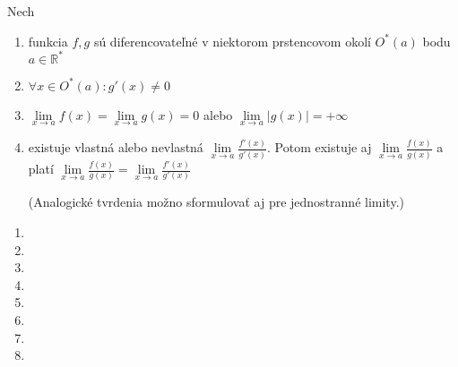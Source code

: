 \begin{veta}
Nech
\begin{enumerate}
\item
  funkcia $f,g$ sú diferencovateľné v niektorom prstencovom okolí $O^*(a)$ bodu
  $a\in\mathbb{R^*}$
\item
  $\forall x\in O^*(a):g'(x)\neq 0$
\item
  $\lim\limits_{x\rightarrow a}f(x)=\lim\limits_{x\rightarrow a}g(x)=0$ alebo
  $\lim\limits_{x\rightarrow a}|g(x)|=+\infty$
\item
  existuje vlastná alebo nevlastná $\lim\limits_{x\rightarrow a}\frac{f'(x)}{g'(x)}$.
  Potom existuje aj $\lim\limits_{x\rightarrow a}\frac{f(x)}{g(x)}$ a platí
  $\lim\limits_{x\rightarrow a}\frac{f(x)}{g(x)}=\lim\limits_{x\rightarrow
  a}\frac{f'(x)}{g'(x)}$

(Analogické tvrdenia možno sformulovať aj pre jednostranné limity.)
\end{enumerate}
\end{veta}

\begin{enumerate}[resume]
  \item {}
  \item {}
  \item {}
  \item {}
  \item {}
  \item {}
  \item {}
  \item {}
\end{enumerate}
